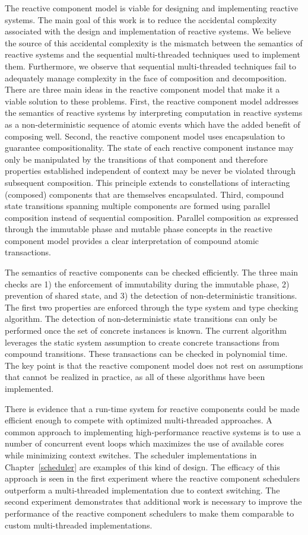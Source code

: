 The reactive component model is viable for designing and implementing reactive systems.
The main goal of this work is to reduce the accidental complexity associated with the design and implementation of reactive systems.
We believe the source of this accidental complexity is the mismatch between the semantics of reactive systems and the sequential multi-threaded techniques used to implement them.
Furthermore, we observe that sequential multi-threaded techniques fail to adequately manage complexity in the face of composition and decomposition.
There are three main ideas in the reactive component model that make it a viable solution to these problems.
First, the reactive component model addresses the semantics of reactive systems by interpreting computation in reactive systems as a non-deterministic sequence of atomic events which have the added benefit of composing well.
Second, the reactive component model uses encapsulation to guarantee compositionality.
The state of each reactive component instance may only be manipulated by the transitions of that component and therefore properties established independent of context may be never be violated through subsequent composition.
This principle extends to constellations of interacting (composed) components that are themselves encapsulated.
Third, compound state transitions spanning multiple components are formed using parallel composition instead of sequential composition.
Parallel composition as expressed through the immutable phase and mutable phase concepts in the reactive component model provides a clear interpretation of compound atomic transactions.

The semantics of reactive components can be checked efficiently.
The three main checks are 1) the enforcement of immutability during the immutable phase, 2) prevention of shared state, and 3) the detection of non-deterministic transitions.
The first two properties are enforced through the type system and type checking algorithm.
The detection of non-deterministic state transitions can only be performed once the set of concrete instances is known.
The current algorithm leverages the static system assumption to create concrete transactions from compound transitions.
These transactions can be checked in polynomial time.
The key point is that the reactive component model does not rest on assumptions that cannot be realized in practice, as all of these algorithms have been implemented.

There is evidence that a run-time system for reactive components could be made efficient enough to compete with optimized multi-threaded approaches.
A common approach to implementing high-performance reactive systems is to use a number of concurrent event loops which maximizes the use of available cores while minimizing context switches.
The scheduler implementations in Chapter~\ref{scheduler} are examples of this kind of design.
The efficacy of this approach is seen in the first experiment where the reactive component schedulers outperform a multi-threaded implementation due to context switching.
The second experiment demonstrates that additional work is necessary to improve the performance of the reactive component schedulers to make them comparable to custom multi-threaded implementations.

